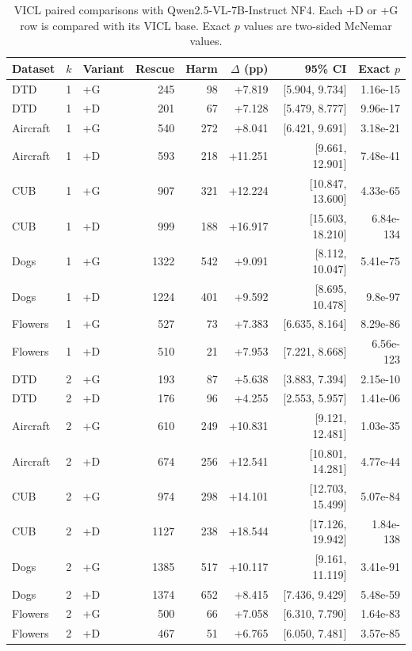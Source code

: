 \documentclass[10pt,twocolumn,letterpaper]{article}
\begin{document}
\begin{table}[t]
\caption{VICL paired comparisons with Qwen2.5-VL-7B-Instruct NF4. Each +D or +G row is compared with its VICL base. Exact $p$ values are two-sided McNemar values.}
\label{sup:vicl_paired_qwen25}
\centering\small\setlength{\tabcolsep}{6pt}
\begin{tabular}{lllrrrrr}
\toprule
Dataset & $k$ & Variant & Rescue & Harm & $\Delta$ (pp) & 95\% CI & Exact $p$ \\
\midrule
DTD & 1 & +G & 245 & 98 & +7.819 & [5.904, 9.734] & 1.16e-15 \\
DTD & 1 & +D & 201 & 67 & +7.128 & [5.479, 8.777] & 9.96e-17 \\
Aircraft & 1 & +G & 540 & 272 & +8.041 & [6.421, 9.691] & 3.18e-21 \\
Aircraft & 1 & +D & 593 & 218 & +11.251 & [9.661, 12.901] & 7.48e-41 \\
CUB & 1 & +G & 907 & 321 & +12.224 & [10.847, 13.600] & 4.33e-65 \\
CUB & 1 & +D & 999 & 188 & +16.917 & [15.603, 18.210] & 6.84e-134 \\
Dogs & 1 & +G & 1322 & 542 & +9.091 & [8.112, 10.047] & 5.41e-75 \\
Dogs & 1 & +D & 1224 & 401 & +9.592 & [8.695, 10.478] & 9.8e-97 \\
Flowers & 1 & +G & 527 & 73 & +7.383 & [6.635, 8.164] & 8.29e-86 \\
Flowers & 1 & +D & 510 & 21 & +7.953 & [7.221, 8.668] & 6.56e-123 \\
DTD & 2 & +G & 193 & 87 & +5.638 & [3.883, 7.394] & 2.15e-10 \\
DTD & 2 & +D & 176 & 96 & +4.255 & [2.553, 5.957] & 1.41e-06 \\
Aircraft & 2 & +G & 610 & 249 & +10.831 & [9.121, 12.481] & 1.03e-35 \\
Aircraft & 2 & +D & 674 & 256 & +12.541 & [10.801, 14.281] & 4.77e-44 \\
CUB & 2 & +G & 974 & 298 & +14.101 & [12.703, 15.499] & 5.07e-84 \\
CUB & 2 & +D & 1127 & 238 & +18.544 & [17.126, 19.942] & 1.84e-138 \\
Dogs & 2 & +G & 1385 & 517 & +10.117 & [9.161, 11.119] & 3.41e-91 \\
Dogs & 2 & +D & 1374 & 652 & +8.415 & [7.436, 9.429] & 5.48e-59 \\
Flowers & 2 & +G & 500 & 66 & +7.058 & [6.310, 7.790] & 1.64e-83 \\
Flowers & 2 & +D & 467 & 51 & +6.765 & [6.050, 7.481] & 3.57e-85 \\
\bottomrule
\end{tabular}
\end{table}
\end{document}

